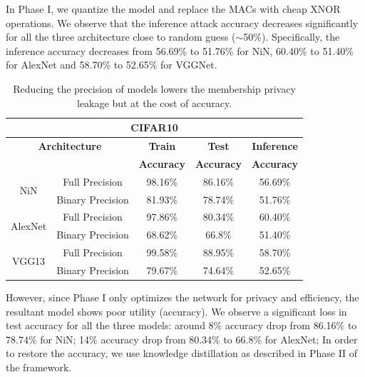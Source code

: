 In Phase I, we quantize the model and replace the MACs with cheap XNOR operations.
We observe that the inference attack accuracy decreases significantly for all the three architecture close to random guess ($\sim$50\%).
Specifically, the inference accuracy decreases from 56.69\% to 51.76\% for NiN, 60.40\% to 51.40\% for AlexNet and 58.70\% to 52.65\% for VGGNet.


\begin{table}[!htb]
\begin{center}
\renewcommand\arraystretch{1.5}
\fontsize{6.7pt}{6.7pt}\selectfont
\begin{tabular}{|c|c|c|c|c|}
\hline
\multicolumn{5}{|c|}{\textbf{CIFAR10}} \\
\hline
\multicolumn{2}{|c|}{\textbf{Architecture}} & \textbf{Train}  & \textbf{Test}  & \textbf{Inference}  \\
 \multicolumn{2}{|c|}{} & \textbf{Accuracy} & \textbf{Accuracy} & \textbf{Accuracy}  \\
\hline
\multirow{2}{*}{NiN} & Full Precision & 98.16\% & 86.16\% & \cellcolor{red!25}56.69\% \\
& Binary Precision & 81.93\% & 78.74\% & \cellcolor{green!25}51.76\% \\
\hline
\multirow{2}{*}{AlexNet} & Full Precision & 97.86\% & 80.34\% & \cellcolor{red!25}60.40\% \\
& Binary Precision & 68.62\% & 66.8\% & \cellcolor{green!25}51.40\% \\
\hline
\multirow{2}{*}{VGG13} & Full Precision & 99.58\% & 88.95\% & \cellcolor{red!25}58.70\%\\
& Binary Precision & 79.67\% & 74.64\% & \cellcolor{green!25}52.65\%\\
\hline
\end{tabular}
\end{center}
\caption{Reducing the precision of models lowers the membership privacy leakage but at the cost of accuracy.}
\label{cifar10quant}
\end{table}


However, since Phase I only optimizes the network for privacy and efficiency, the resultant model shows poor utility (accuracy).
We observe a significant loss in test accuracy for all the three models: around 8\% accuracy drop from 86.16\% to 78.74\% for NiN; 14\% accuracy drop from 80.34\% to 66.8\% for AlexNet;
In order to restore the accuracy, we use knowledge distillation as described in Phase II of the \method\hspace{0.02in} framework.

